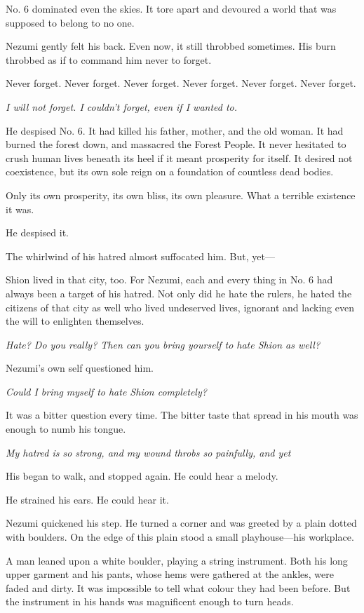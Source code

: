 No. 6 dominated even the skies. It tore apart and devoured a world that
was supposed to belong to no one.

Nezumi gently felt his back. Even now, it still throbbed sometimes. His
burn throbbed as if to command him never to forget.

Never forget. Never forget. Never forget. Never forget. Never forget.
Never forget.

\emph{I will not forget. I couldn't forget, even if I wanted to.}

He despised No. 6. It had killed his father, mother, and the old woman.
It had burned the forest down, and massacred the Forest People. It never
hesitated to crush human lives beneath its heel if it meant prosperity
for itself. It desired not coexistence, but its own sole reign on a
foundation of countless dead bodies.

Only its own prosperity, its own bliss, its own pleasure. What a
terrible existence it was.

He despised it.

The whirlwind of his hatred almost suffocated him. But, yet---

Shion lived in that city, too. For Nezumi, each and every thing in No. 6
had always been a target of his hatred. Not only did he hate the rulers,
he hated the citizens of that city as well who lived undeserved lives,
ignorant and lacking even the will to enlighten themselves.

\emph{Hate? Do you really? Then can you bring yourself to hate Shion as well?}

Nezumi's own self questioned him.

\emph{Could I bring myself to hate Shion completely?}

It was a bitter question every time. The bitter taste that spread in his
mouth was enough to numb his tongue.

\emph{My hatred is so strong, and my wound throbs so painfully, and yet\el }

His began to walk, and stopped again. He could hear a melody.

He strained his ears. He could hear it.

Nezumi quickened his step. He turned a corner and was greeted by a plain
dotted with boulders. On the edge of this plain stood a small
playhouse---his workplace.

A man leaned upon a white boulder, playing a string instrument. Both his
long upper garment and his pants, whose hems were gathered at the
ankles, were faded and dirty. It was impossible to tell what colour they
had been before. But the instrument in his hands was magnificent enough
to turn heads.

